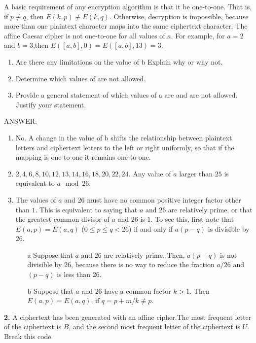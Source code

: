 \documentclass[paper=a4, fontsize=11pt]{scrartcl} %
\numberwithin{equation}{section} %
\numberwithin{figure}{section} %
\numberwithin{table}{section} %
\begin{document}
A basic requirement of any encryption algorithm is that it be
one-to-one. That is, if $p\not\equiv q$, then $E(k,p)\not\equiv E(k,q)$. Otherwise, decryption is impossible, because more than one plaintext character maps into the same ciphertext character. The affine Caesar cipher is not one-to-one for all values of $a$. For example, for $a=2$ and $b=3$,then $E([a,b],0)=E([a,b],13)=3$.

\begin{enumerate}
\item Are there any limitations on the value of b Explain why or why not.
\item Determine which values of are not allowed.
\item Provide a general statement of which values of a are and are not allowed. Justify your statement.
\end{enumerate}

ANSWER:

\begin{enumerate}
\item No. A change in the value of b shifts the relationship between
  plaintext letters and ciphertext letters to the left or right
  uniformly, so that if the mapping is one-to-one it remains
  one-to-one.
\item $2,4,6,8,10,12,13,14,16,18,20,22,24$. Any value of $a$ larger than $25$ is equivalent to $a \mod 26$.
\item The values of $a$ and $26$ must have no common positive integer
  factor other than $1$. This is equivalent to saying that $a$ and $26$ are
  relatively prime, or that the greatest common divisor of $a$ and $26$ is
  $1$. To see this, first note that $E(a,p) = E(a,q)$ ($0\le p \le
  q<26$) if and only if $a(p-q)$ is divisible by $26$.
  \begin{enumerate}
  \item[a] Suppose that $a$ and $26$ are relatively prime. Then, $a(p-q)$ is not divisible by $26$, because there is no way to reduce the fraction $a/26$ and $(p-q)$ is less than $26$.
  \item[b] Suppose that $a$ and $26$ have a common factor $k>1$. Then
    $E(a,p)=E(a,q)$, if $q=p+m/k\not\equiv p$.
  \end{enumerate}
\end{enumerate}


\textbf{2.} A ciphertext has been generated with an affine cipher.The most frequent letter of the ciphertext is $B$, and the second most frequent letter of the ciphertext is $U$. Break this code.
\end{document}

